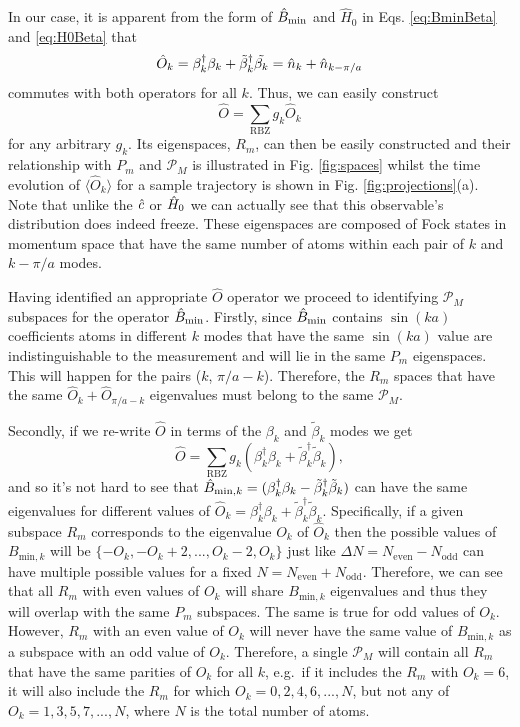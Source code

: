 In our case, it is apparent from the form of $\hat{B}_\mathrm{min}$ and $\hat{H}_0$
in Eqs. \eqref{eq:BminBeta} and \eqref{eq:H0Beta} that
\begin{equation}
\hat{O}_k = \beta_k^\dagger \beta_k + \tilde{\beta}_k^\dagger
\tilde{\beta_k} = \hat{n}_k + \hat{n}_{k - \pi/a}
\end{equation}
commutes with both operators for all $k$. Thus, we can easily
construct 
\begin{equation}
\hat{O} = \sum_\mathrm{RBZ} g_k \hat{O}_k
\end{equation}
for any arbitrary $g_k$. Its eigenspaces, $R_m$, can then be easily
constructed and their relationship with $P_m$ and $\mathcal{P}_M$ is
illustrated in Fig. \ref{fig:spaces} whilst the time evolution of
$\langle \hat{O}_k \rangle$ for a sample trajectory is shown in
Fig. \ref{fig:projections}(a). Note that unlike the $\hat{c}$ or $\hat{H}_0$ we
can actually see that this observable's distribution does indeed
freeze. These eigenspaces are composed of Fock states in momentum
space that have the same number of atoms within each pair of $k$ and
$k - \pi/a$ modes.

Having identified an appropriate $\hat{O}$ operator we proceed to
identifying $\mathcal{P}_M$ subspaces for the operator
$\hat{B}_\mathrm{min}$. Firstly, since $\hat{B}_\mathrm{min}$ contains $\sin(ka)$ coefficients atoms
in different $k$ modes that have the same $\sin(ka)$ value are
indistinguishable to the measurement and will lie in the same $P_m$
eigenspaces. This will happen for the pairs ($k$, $\pi/a -
k$). Therefore, the $R_m$ spaces that have the same $\hat{O}_k +
\hat{O}_{\pi/a - k}$ eigenvalues must belong to the same
$\mathcal{P}_M$.

Secondly, if we re-write $\hat{O}$ in terms of the $\beta_k$ and
$\tilde{\beta}_k$ modes we get
\begin{equation} 
  \hat{O} = \sum_{\mathrm{RBZ}} g_k \left(
    \beta^\dagger_k \beta_k + \tilde{\beta}_k^\dagger \tilde{\beta}_k
  \right),
\end{equation}
and so it's not hard to see that
$\hat{B}_{\mathrm{min},k} = (\beta^\dagger_k \beta_k -
\tilde{\beta}_k^\dagger \tilde{\beta}_k)$ can have the same
eigenvalues for different values of
$\hat{O}_k = \beta^\dagger_k \beta_k + \tilde{\beta}_k^\dagger
\tilde{\beta}_k$. Specifically, if a given subspace $R_m$ corresponds
to the eigenvalue $O_k$ of $\hat{O}_k$ then the possible values of
$B_{\mathrm{min},k}$ will be $\{-O_k, -O_k + 2, ..., O_k - 2, O_k\}$
just like $\Delta N = N_\mathrm{even} - N_\mathrm{odd}$ can have
multiple possible values for a fixed
$N = N_\mathrm{even} + N_\mathrm{odd}$. Therefore, we can see that all
$R_m$ with even values of $O_k$ will share $B_{\mathrm{min},k}$
eigenvalues and thus they will overlap with the same $P_m$
subspaces. The same is true for odd values of $O_k$. However, $R_m$
with an even value of $O_k$ will never have the same value of
$B_{\mathrm{min},k}$ as a subspace with an odd value of
$O_k$. Therefore, a single $\mathcal{P}_M$ will contain all $R_m$ that
have the same parities of $O_k$ for all $k$, e.g.~if it includes the
$R_m$ with $O_k = 6$, it will also include the $R_m$ for which
$O_k = 0, 2, 4, 6, ..., N$, but not any of $O_k = 1, 3, 5, 7, ..., N$,
where $N$ is the total number of atoms.

